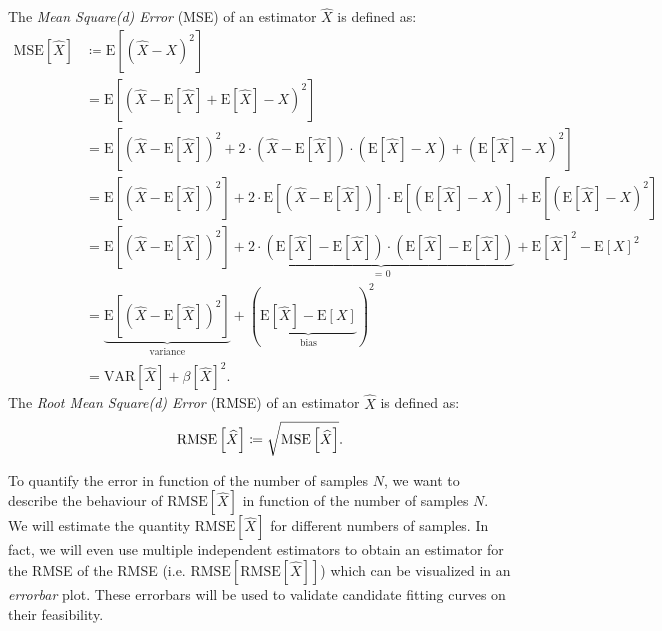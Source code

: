 \documentclass[10pt,a4paper]{article}
\numberwithin{equation}{section}
\begin{document}
The \textit{Mean Square(d) Error} (MSE) of an estimator $\widehat{X}$ is defined as:
\begin{align}
\mathrm{MSE}\left[\widehat{X}\right] &\coloneqq \mathrm{E}\left[{\left(\widehat{X} - X\right)}^{2}\right] \\
&= \mathrm{E}\left[{\left(\widehat{X} - \mathrm{E}\left[\widehat{X}\right] + \mathrm{E}\left[\widehat{X}\right] - X\right)}^{2}\right] \nonumber \\
&= \mathrm{E}\left[{\left(\widehat{X} - \mathrm{E}\left[\widehat{X}\right]\right)}^{2} + 2 \cdot \left(\widehat{X} - \mathrm{E}\left[\widehat{X}\right]\right) \cdot \left(\mathrm{E}\left[\widehat{X}\right] - X\right) + {\left(\mathrm{E}\left[\widehat{X}\right] - X\right)}^{2}\right] \nonumber \\
&= \mathrm{E}\left[{\left(\widehat{X} - \mathrm{E}\left[\widehat{X}\right]\right)}^{2}\right] + 2 \cdot \mathrm{E}\left[\left(\widehat{X} - \mathrm{E}\left[\widehat{X}\right]\right)\right] \cdot \mathrm{E}\left[\left(\mathrm{E}\left[\widehat{X}\right] - X\right)\right] + \mathrm{E}\left[{\left(\mathrm{E}\left[\widehat{X}\right] - X\right)}^{2}\right] \nonumber \\
&= \mathrm{E}\left[{\left(\widehat{X} - \mathrm{E}\left[\widehat{X}\right]\right)}^{2}\right] + \underbrace{2 \cdot \left(\mathrm{E}\left[\widehat{X}\right] - \mathrm{E}\left[\widehat{X}\right]\right) \cdot \left(\mathrm{E}\left[\widehat{X}\right] - \mathrm{E}\left[\widehat{X}\right]\right)}_{\text{ = 0}} + {\mathrm{E}\left[\widehat{X}\right]}^{2} - {\mathrm{E}\left[X\right]}^{2} \nonumber \\
&= \underbrace{\mathrm{E}\left[{\left(\widehat{X} - \mathrm{E}\left[\widehat{X}\right]\right)}^{2}\right]}_{\text{variance}} + {\left(\underbrace{\mathrm{E}\left[\widehat{X}\right] - \mathrm{E}\left[X\right]}_{\text{bias}}\right)}^{2} \nonumber \\
&= \mathrm{VAR}\left[\widehat{X}\right] + {\beta\left[\widehat{X}\right]}^{2}.
\end{align}
The \textit{Root Mean Square(d) Error} (RMSE) of an estimator $\widehat{X}$ is defined as:
\begin{equation}
\mathrm{RMSE}\left[\widehat{X}\right] \coloneqq \sqrt{\mathrm{MSE}\left[\widehat{X}\right]}. \\
\end{equation}

To quantify the error in function of the number of samples $N$, we want to describe the behaviour of $\mathrm{RMSE}\left[\widehat{X}\right]$ in function of the number of samples $N$. We will estimate the quantity $\mathrm{RMSE}\left[\widehat{X}\right]$ for different numbers of samples. In fact, we will even use multiple independent estimators to obtain an estimator for the RMSE of the RMSE (i.e. $\mathrm{RMSE}\left[\mathrm{RMSE}\left[\widehat{X}\right]\right]$) which can be visualized in an \textit{errorbar} plot. These errorbars will be used to validate candidate fitting curves on their feasibility.
\end{document}
